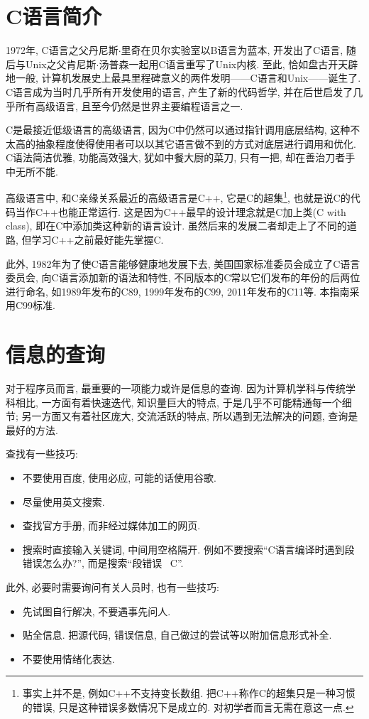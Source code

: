     \section{C语言简介} \label{C语言简介}
        1972年, C语言之父丹尼斯$\cdot$里奇在贝尔实验室以B语言为蓝本, 开发出了C语言, 随后与Unix之父肯尼斯$\cdot$汤普森一起用C语言重写了Unix内核. 至此, 恰如盘古开天辟地一般, 计算机发展史上最具里程碑意义的两件发明——C语言和Unix——诞生了. C语言成为当时几乎所有开发使用的语言, 产生了新的代码哲学, 并在后世启发了几乎所有高级语言, 且至今仍然是世界主要编程语言之一. 
        
        C是最接近低级语言的高级语言, 因为C中仍然可以通过指针调用底层结构, 这种不太高的抽象程度使得使用者可以以其它语言做不到的方式对底层进行调用和优化. C语法简洁优雅, 功能高效强大, 犹如中餐大厨的菜刀, 只有一把, 却在善治刀者手中无所不能.

        高级语言中, 和C亲缘关系最近的高级语言是C++, 它是C的超集\footnote{事实上并不是, 例如C++不支持变长数组. 把C++称作C的超集只是一种习惯的错误, 只是这种错误多数情况下是成立的. 对初学者而言无需在意这一点.}, 也就是说C的代码当作C++也能正常运行. 这是因为C++最早的设计理念就是C加上类(C with class), 即在C中添加类这种新的语言设计. 虽然后来的发展二者却走上了不同的道路, 但学习C++之前最好能先掌握C.

        此外, 1982年为了使C语言能够健康地发展下去, 美国国家标准委员会成立了C语言委员会, 向C语言添加新的语法和特性, 不同版本的C常以它们发布的年份的后两位进行命名, 如1989年发布的C89, 1999年发布的C99, 2011年发布的C11等. 本指南采用C99标准.

    \section{信息的查询} \label{信息的查询}
        对于程序员而言, 最重要的一项能力或许是信息的查询. 因为计算机学科与传统学科相比, 一方面有着快速迭代, 知识量巨大的特点, 于是几乎不可能精通每一个细节; 另一方面又有着社区庞大, 交流活跃的特点, 所以遇到无法解决的问题, 查询是最好的方法.

        查找有一些技巧:
        \vspace*{-13pt}
        \begin{itemize}
            \item 不要使用百度, 使用必应, 可能的话使用谷歌.
            \item 尽量使用英文搜索.
            \item 查找官方手册, 而非经过媒体加工的网页.
            \item 搜索时直接输入关键词, 中间用空格隔开. 例如不要搜索``C语言编译时遇到段错误怎么办?'', 而是搜索``段错误 \ C''.
        \end{itemize}

        此外, 必要时需要询问有关人员时, 也有一些技巧:
        \vspace*{-13pt}
        \begin{itemize}
            \item 先试图自行解决, 不要遇事先问人.
            \item 贴全信息. 把源代码, 错误信息, 自己做过的尝试等以附加信息形式补全.
            \item 不要使用情绪化表达. 
        \end{itemize}